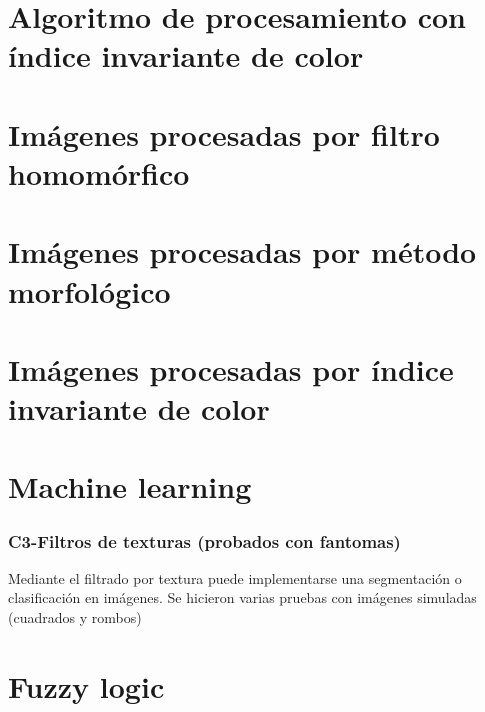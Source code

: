 \documentclass[11pt,a4paper]{report}
\begin{document}


\chapter{Algoritmo de procesamiento con índice invariante de color} 



\chapter{Imágenes procesadas por filtro homomórfico} \label{anexo_homo}
% 
\chapter{Imágenes procesadas por método morfológico} \label{anexo_morfo}
 \chapter{Imágenes procesadas por índice invariante de color} \label{anexo_IIC}
\chapter{Machine learning} 
\subsection{C3-Filtros de texturas (probados con fantomas)} %
Mediante el filtrado por textura puede implementarse una segmentación o clasificación en imágenes. Se hicieron varias pruebas con imágenes simuladas (cuadrados y rombos)


\chapter{Fuzzy logic} 
    

	


\printbibliography[title={Referencias}, heading=bibintoc]
\end{document}

